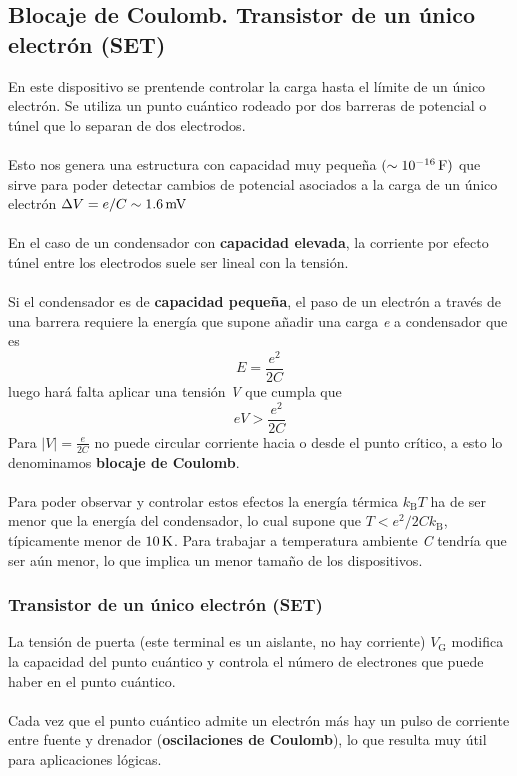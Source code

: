\subsection{Blocaje de Coulomb. Transistor de un único electrón (SET)} 
En este dispositivo se prentende controlar la carga hasta el límite de un único electrón. Se utiliza un punto cuántico rodeado por dos barreras de potencial o túnel que lo separan de dos electrodos.\\\\
Esto nos genera una estructura con capacidad muy pequeña $(\unit[\sim 10^{-16}]{F})$ que sirve para poder detectar cambios de potencial asociados a la carga de un único electrón $\Delta V=e/C \sim \unit[1.6]{mV}$\\\\
En el caso de un condensador con \textbf{capacidad elevada}, la corriente por efecto túnel entre los electrodos suele ser lineal con la tensión.\\\\
Si el condensador es de \textbf{capacidad pequeña}, el paso de un electrón a través de una barrera requiere la energía que supone añadir una carga \textit{e} a condensador que es $$E=\frac{e^2}{2C}$$ luego hará falta aplicar una tensión \textit{V} que cumpla que $$eV>\frac{e^2}{2C}$$ Para $|V|=\frac{e}{2C}$ no puede circular corriente hacia o desde el punto crítico, a esto lo denominamos \textbf{blocaje de Coulomb}. \\\\
Para poder observar y controlar estos efectos la energía térmica $k_\mathrm{B}T$ ha de ser menor que la energía del condensador, lo cual supone que $T<e^2/2Ck_\mathrm{B}$, típicamente menor de $\unit[10]{K}$. Para trabajar a temperatura ambiente \textit{C} tendría que ser aún menor, lo que implica un menor tamaño de los dispositivos.
\subsubsection{Transistor de un único electrón (SET)}
La tensión de puerta (este terminal es un aislante, no hay corriente) $V_\mathrm{G}$ modifica la capacidad del punto cuántico y controla el número de electrones que puede haber en el punto cuántico.\\\\
Cada vez que el punto cuántico admite un electrón más hay un pulso de corriente entre fuente y drenador (\textbf{oscilaciones de Coulomb}), lo que resulta muy útil para aplicaciones lógicas.
